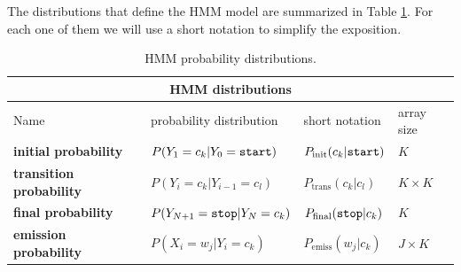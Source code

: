 
 The distributions that define the HMM model are summarized in Table
\ref{tab:hmm-dist}. 
For each one
of them we will use a short notation to simplify the exposition.
\begin{table}[h]
\begin{center}
\begin{tabular}{|l|l|l|l|}
\hline
\multicolumn{4}{|c|}{HMM distributions}\\
\hline
Name & probability distribution & short notation & array size\\
\hline
\textbf{initial probability} & $P(Y_1 = c_k | Y_0 = \text{\tt start})$ & $P_{\mathrm{init}}(c_k|\text{\tt start})$ & $K$ \\
\hline
\textbf{transition probability} & $P(Y_{i}=c_k|Y_{i-1} = c_l)$ & $P_{\mathrm{trans}}(c_k|c_l)$ & $K\times K$\\
\hline
\textbf{final probability} & $P(Y_{N+1} = \text{\tt stop} | Y_N = c_k)$ & $P_{\mathrm{final}}(\text{\tt stop}|c_k)$ & $K$\\
\hline
\textbf{emission probability} & $P(X_i=w_j| Y_i = c_k)$ & $P_{\mathrm{emiss}}(w_j|c_k)$ & $J \times K$ \\
\hline
\end{tabular}
\end{center}
\caption[HMM probability distributions]{\label{tab:hmm-dist} HMM probability distributions.}
\end{table}

